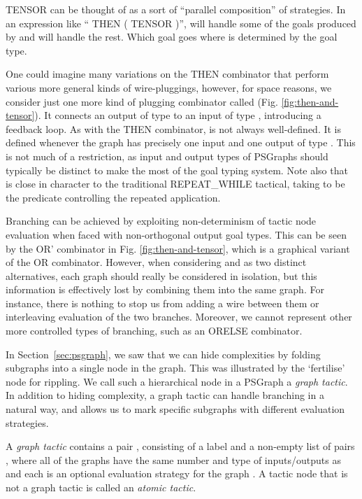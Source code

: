 \documentclass{llncs}
\begin{document}
TENSOR can be thought of as a sort of ``parallel composition'' of strategies. In an expression like `` THEN ( TENSOR )'',  will handle some of the goals produced by  and  will handle the rest. Which goal goes where is determined by the goal type.

 One could imagine many variations on the THEN combinator that perform various more general kinds of wire-pluggings, however, for space reasons, we consider just one more kind of plugging combinator called 
(Fig. \ref{fig:then-and-tensor}). It  connects an output of type  to an input of type , introducing a feedback loop. As with the THEN combinator,  is not always well-defined. It is defined whenever the graph  has precisely one input and one output of type . This is not much of a restriction, as input and output types of PSGraphs should typically be distinct to make the most of the goal typing system. Note also that    is close in character to the traditional REPEAT\_WHILE tactical,
taking  to be the predicate controlling the repeated application.

Branching can be achieved by exploiting non-determinism of tactic node evaluation when faced with non-orthogonal output goal types.
This can be seen by the OR' combinator in Fig. \ref{fig:then-and-tensor}, which is a graphical variant of the OR combinator. 
However, when considering  and  as two distinct alternatives, each graph should really be considered in isolation, but this information is effectively lost by combining them into the same graph. For instance, there is nothing to stop us from adding a wire between them or interleaving evaluation of the two branches. Moreover, we cannot represent other more controlled types of branching, such as an ORELSE combinator.

In Section~\ref{sec:psgraph}, we saw that we can hide complexities by folding subgraphs into a single node in the graph. 
This was illustrated by the `fertilise' node for rippling. We call such a hierarchical node in a PSGraph a \emph{graph tactic}.
In addition to hiding complexity, a graph tactic can handle branching in a natural way, and allows us to mark specific subgraphs with different evaluation strategies. 

\begin{definition}\label{def:graph-tactic} \rm
  A \textit{graph tactic}  contains a pair , consisting of a label  and a non-empty list of pairs , where all of the graphs  have the same number and type of inputs/outputs as  and each  is an optional evaluation strategy for the graph .  A tactic node that is not a graph tactic is called an \emph{atomic tactic}.
\end{definition}
\end{document}

